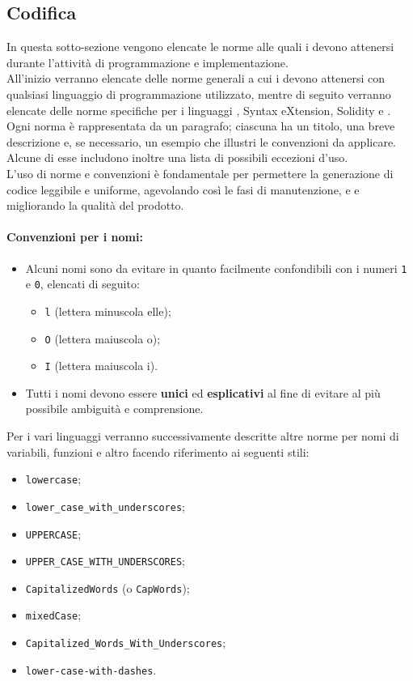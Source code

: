 \documentclass[NormeDiProgetto.tex]{subfiles}
\begin{document}
\subsection{Codifica}
In questa sotto-sezione vengono elencate le norme alle quali i \progri devono attenersi durante l'attività di programmazione e implementazione.\\
All'inizio verranno elencate delle norme generali a cui i \progri devono attenersi con qualsiasi linguaggio di programmazione utilizzato, mentre di seguito verranno elencate delle norme specifiche per i linguaggi ,  Syntax eXtension, Solidity e .\\
Ogni norma è rappresentata da un paragrafo; ciascuna ha un titolo, una breve descrizione e, se necessario, un esempio che illustri le convenzioni da applicare. Alcune di esse includono inoltre una lista di possibili eccezioni d'uso.\\
L'uso di norme e convenzioni è fondamentale per permettere la generazione di codice leggibile e uniforme, agevolando così le fasi di manutenzione,  e  e migliorando la qualità del prodotto.

\paragraph*{Convenzioni per i nomi: }
\begin{itemize}
	\item Alcuni nomi sono da evitare in quanto facilmente confondibili con i numeri \texttt{1} e \texttt{0}, elencati di seguito:
	\begin{itemize}
		\item \texttt{l} (lettera minuscola elle);
		\item \texttt{O} (lettera maiuscola o);
		\item \texttt{I} (lettera maiuscola i).
	\end{itemize}
	\item Tutti i nomi devono essere \textbf{unici} ed \textbf{esplicativi} al fine di evitare al più possibile ambiguità e comprensione.
\end{itemize}
Per i vari linguaggi verranno successivamente descritte altre norme per nomi di variabili, funzioni e altro facendo riferimento ai seguenti stili:
\begin{itemize}
	\item \texttt{lowercase};
	\item \texttt{lower\_case\_with\_underscores};
	\item \texttt{UPPERCASE};
	\item \texttt{UPPER\_CASE\_WITH\_UNDERSCORES};
	\item \texttt{CapitalizedWords} (o \texttt{CapWords});
	\item \texttt{mixedCase};
	\item \texttt{Capitalized\_Words\_With\_Underscores};
	\item \texttt{lower-case-with-dashes}.
\end{itemize}
\end{document}
